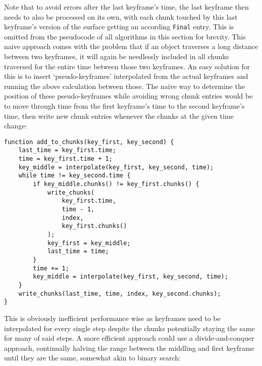 Note that to avoid errors after the last keyframe's time,
the last keyframe then needs to also be processed on its own,
with each chunk touched by this last keyframe's version of the surface getting an according \verb|Final| entry.
This is omitted from the pseudocode of all algorithms in this section for brevity.
\newline
This naive approach comes with the problem that if an object traverses a long distance between two keyframes,
it will again be needlessly included in all chunks traversed for the entire time between those two keyframes.
An easy solution for this is to insert `pseudo-keyframes' interpolated from the actual keyframes
and running the above calculation between those.
\newline
The naive way to determine the position of these pseudo-keyframes while avoiding wrong chunk entries
would be to move through time from the first keyframe's time to the second keyframe's time,
then write new chunk entries whenever the chunks at the given time change:

\begin{lstlisting}[basicstyle=\small, caption={[Chunk calculation using pseudo-keyframes]Using pseudo-keyframes for more accurate chunks}, label={lst:pseudoKeyframes}]
function add_to_chunks(key_first, key_second) {
    last_time = key_first.time;
    time = key_first.time + 1;
    key_middle = interpolate(key_first, key_second, time);
    while time != key_second.time {
        if key_middle.chunks() != key_first.chunks() {
            write_chunks(
                key_first.time,
                time - 1,
                index,
                key_first.chunks()
            );
            key_first = key_middle;
            last_time = time;
        }
        time += 1;
        key_middle = interpolate(key_first, key_second, time);
    }
    write_chunks(last_time, time, index, key_second.chunks);
}
\end{lstlisting}

This is obviously inefficient performance wise as keyframes need to be interpolated for every single step
despite the chunks potentially staying the same for many of said steps.
A more efficient approach could use a divide-and-conquer approach,
continually halving the range between the middling and first keyframe until they are the same,
somewhat akin to binary search:

